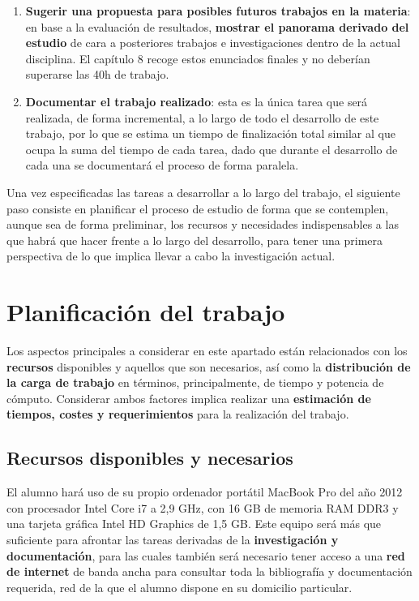 \begin{enumerate}
	\item  \label{tarea10} \textbf{Sugerir una propuesta para posibles futuros trabajos en la materia}: en base a la evaluación de resultados, \textbf{mostrar el panorama derivado del estudio} de cara a posteriores trabajos e investigaciones dentro de la actual disciplina. El capítulo 8 recoge estos enunciados finales y no deberían superarse las 40h de trabajo.
	
	\item  \label{tarea11} \textbf{Documentar el trabajo realizado}: esta es la única tarea que será realizada, de forma incremental, a lo largo de todo el desarrollo de este trabajo, por lo que se estima un tiempo de finalización total similar al que ocupa la suma del tiempo de cada tarea, dado que durante el desarrollo de cada una se documentará el proceso de forma paralela.
\end{enumerate}

Una vez especificadas las tareas a desarrollar a lo largo del trabajo, el siguiente paso consiste en planificar el proceso de estudio de forma que se contemplen, aunque sea de forma preliminar, los recursos y necesidades indispensables a las que habrá que hacer frente a lo largo del desarrollo, para tener una primera perspectiva de lo que implica llevar a cabo la investigación actual.

\section{Planificación del trabajo} 

Los aspectos principales a considerar en este apartado están relacionados con los \textbf{recursos} disponibles y aquellos que son necesarios, así como la \textbf{distribución de la carga de trabajo} en términos, principalmente, de tiempo y potencia de cómputo. Considerar ambos factores implica realizar una \textbf{estimación de tiempos, costes y requerimientos} para la realización del trabajo.

\subsection{Recursos disponibles y necesarios}

El alumno hará uso de su propio ordenador portátil MacBook Pro del año 2012 con procesador Intel Core i7 a 2,9 GHz, con 16 GB de memoria RAM DDR3 y una tarjeta gráfica Intel HD Graphics de 1,5 GB. Este equipo será más que suficiente para afrontar las tareas derivadas de la \textbf{investigación y documentación}, para las cuales también será necesario tener acceso a una \textbf{red de internet} de banda ancha para consultar toda la bibliografía y documentación requerida, red de la que el alumno dispone en su domicilio particular.

